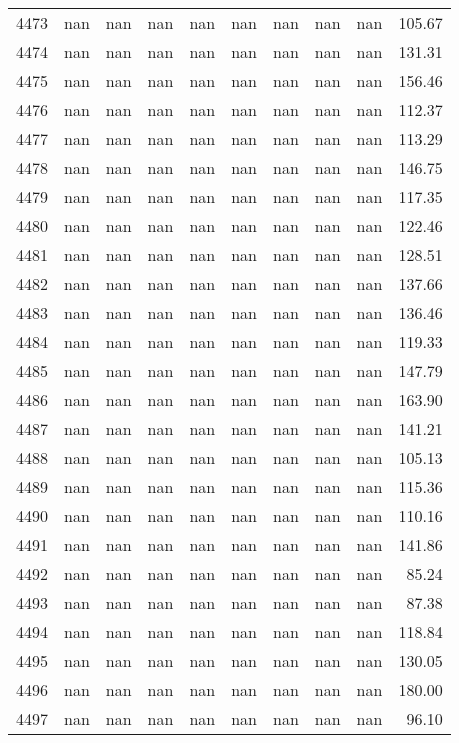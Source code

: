 \begin{tabular}{lrrrrrrrrr}
4473 & nan & nan & nan & nan & nan & nan & nan & nan & 105.67 \\
4474 & nan & nan & nan & nan & nan & nan & nan & nan & 131.31 \\
4475 & nan & nan & nan & nan & nan & nan & nan & nan & 156.46 \\
4476 & nan & nan & nan & nan & nan & nan & nan & nan & 112.37 \\
4477 & nan & nan & nan & nan & nan & nan & nan & nan & 113.29 \\
4478 & nan & nan & nan & nan & nan & nan & nan & nan & 146.75 \\
4479 & nan & nan & nan & nan & nan & nan & nan & nan & 117.35 \\
4480 & nan & nan & nan & nan & nan & nan & nan & nan & 122.46 \\
4481 & nan & nan & nan & nan & nan & nan & nan & nan & 128.51 \\
4482 & nan & nan & nan & nan & nan & nan & nan & nan & 137.66 \\
4483 & nan & nan & nan & nan & nan & nan & nan & nan & 136.46 \\
4484 & nan & nan & nan & nan & nan & nan & nan & nan & 119.33 \\
4485 & nan & nan & nan & nan & nan & nan & nan & nan & 147.79 \\
4486 & nan & nan & nan & nan & nan & nan & nan & nan & 163.90 \\
4487 & nan & nan & nan & nan & nan & nan & nan & nan & 141.21 \\
4488 & nan & nan & nan & nan & nan & nan & nan & nan & 105.13 \\
4489 & nan & nan & nan & nan & nan & nan & nan & nan & 115.36 \\
4490 & nan & nan & nan & nan & nan & nan & nan & nan & 110.16 \\
4491 & nan & nan & nan & nan & nan & nan & nan & nan & 141.86 \\
4492 & nan & nan & nan & nan & nan & nan & nan & nan & 85.24 \\
4493 & nan & nan & nan & nan & nan & nan & nan & nan & 87.38 \\
4494 & nan & nan & nan & nan & nan & nan & nan & nan & 118.84 \\
4495 & nan & nan & nan & nan & nan & nan & nan & nan & 130.05 \\
4496 & nan & nan & nan & nan & nan & nan & nan & nan & 180.00 \\
4497 & nan & nan & nan & nan & nan & nan & nan & nan & 96.10 \\

\end{tabular}
